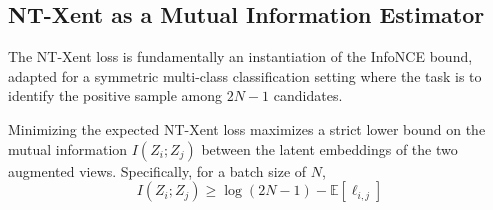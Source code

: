 \subsection{NT-Xent as a Mutual Information Estimator}

The NT-Xent loss is fundamentally an instantiation of the InfoNCE bound, adapted for a symmetric multi-class classification setting where the task is to identify the positive sample among $2N-1$ candidates.

\begin{theorem}
\label{thm:ntxent_mi}
Minimizing the expected NT-Xent loss maximizes a strict lower bound on the mutual information $I(Z_i; Z_j)$ between the latent embeddings of the two augmented views. Specifically, for a batch size of $N$,
\begin{equation}
    I(Z_i; Z_j) \geq \log(2N - 1) - \mathbb{E}[\ell_{i,j}]
\end{equation}
\end{theorem}

